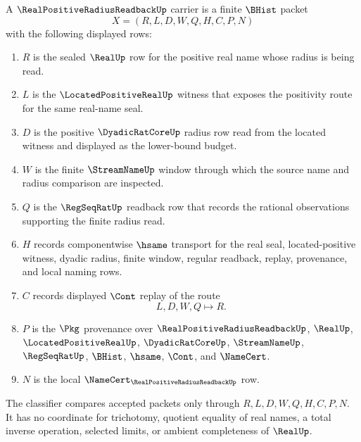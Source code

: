 \begin{definition}
\label{def:real-positive-radius-readback-surface}
A $\RealPositiveRadiusReadbackUp$ carrier is a finite $\BHist$ packet
$$
X=(R,L,D,W,Q,H,C,P,N)
$$
with the following displayed rows:
\begin{enumerate}
\item $R$ is the sealed $\RealUp$ row for the positive real name whose radius is being read.
\item $L$ is the $\LocatedPositiveRealUp$ witness that exposes the positivity route for the same real-name seal.
\item $D$ is the positive $\DyadicRatCoreUp$ radius row read from the located witness and displayed as the lower-bound budget.
\item $W$ is the finite $\StreamNameUp$ window through which the source name and radius comparison are inspected.
\item $Q$ is the $\RegSeqRatUp$ readback row that records the rational observations supporting the finite radius read.
\item $H$ records componentwise $\hsame$ transport for the real seal, located-positive witness, dyadic radius, finite window, regular readback, replay, provenance, and local naming rows.
\item $C$ records displayed $\Cont$ replay of the route
$$
L,D,W,Q \longmapsto R .
$$
\item $P$ is the $\Pkg$ provenance over $\RealPositiveRadiusReadbackUp$, $\RealUp$, $\LocatedPositiveRealUp$, $\DyadicRatCoreUp$, $\StreamNameUp$, $\RegSeqRatUp$, $\BHist$, $\hsame$, $\Cont$, and $\NameCert$.
\item $N$ is the local $\NameCert_{\RealPositiveRadiusReadbackUp}$ row.
\end{enumerate}
The classifier compares accepted packets only through $R,L,D,W,Q,H,C,P,N$. It has no coordinate for trichotomy, quotient equality of real names, a total inverse operation, selected limits, or ambient completeness of $\RealUp$.
\end{definition}

